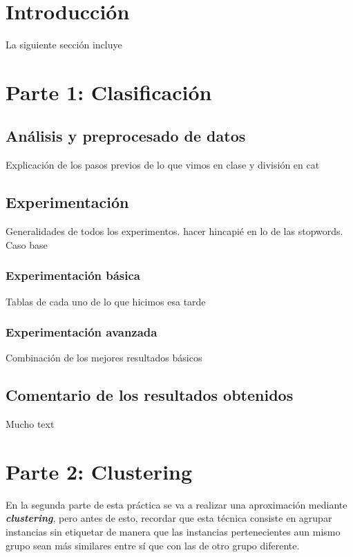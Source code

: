 \documentclass[12pt,a4paper, xcolor=table]{article}
\begin{document}
\section{Introducción}
    La siguiente sección incluye

\section{Parte 1: Clasificación}
    \subsection{Análisis y preprocesado de datos}
        Explicación de los pasos previos de lo que vimos en clase y división en cat
    \subsection{Experimentación}
        Generalidades de todos los experimentos. hacer hincapié en lo de las stopwords. Caso base
        \subsubsection{Experimentación básica}
        Tablas de cada uno de lo que hicimos esa tarde

        \subsubsection{Experimentación avanzada}
        Combinación de los mejores resultados básicos

    \subsection{Comentario de los resultados obtenidos}
    Mucho text

\section{Parte 2: Clustering}

En la segunda parte de esta práctica se va a realizar una aproximación mediante \textbf{\textit{clustering}}, pero antes de esto, recordar que esta técnica consiste en agrupar instancias sin etiquetar de manera que las instancias pertenecientes aun mismo grupo sean más similares entre sí que con las de otro grupo diferente. 

\vspace{2mm}
\end{document}
